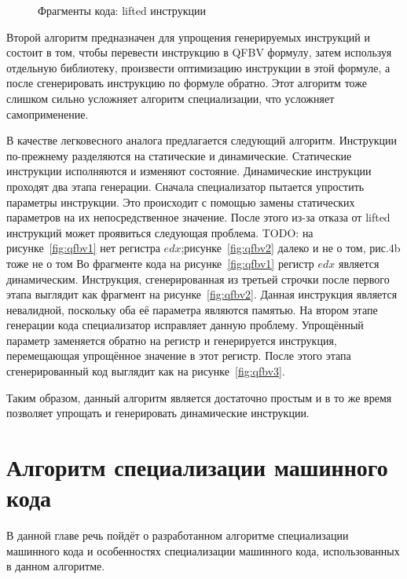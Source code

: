 \begin{figure}[!t]
\subfloat[\label{fig:qfbv1}]{\usebox\boxfour}
\hfill
\subfloat[\label{fig:qfbv2}]{\usebox\boxfive}
\hfill
\subfloat[\label{fig:qfbv3}]{\usebox\boxsix}
\caption{Фрагменты кода: lifted инструкции}
\end{figure}

Второй алгоритм предназначен для упрощения генерируемых инструкций и состоит в том, чтобы перевести инструкцию в QFBV формулу, затем используя отдельную библиотеку, произвести оптимизацию инструкции в этой формуле, а после сгенерировать инструкцию по формуле обратно. Этот алгоритм тоже слишком сильно усложняет алгоритм специализации, что усложняет самоприменение.

В качестве легковесного аналога предлагается следующий алгоритм. Инструкции по-прежнему разделяются на статические и динамические. Статические инструкции исполняются и изменяют состояние. Динамические инструкции проходят два этапа генерации. Сначала специализатор пытается упростить параметры инструкции. Это происходит с помощью замены статических параметров на их непосредственное значение. После этого из-за отказа от lifted инструкций может проявиться следующая проблема.
{\color{red}TODO: на рисунке~\ref{fig:qfbv1} нет регистра $edx$;рисунке~\ref{fig:qfbv2} далеко и не о том, рис.4b тоже не о том} 
Во фрагменте кода на рисунке~\ref{fig:qfbv1} регистр $edx$ является динамическим. Инструкция, сгенерированная из третьей строчки после первого этапа выглядит как фрагмент на рисунке~\ref{fig:qfbv2}.
Данная инструкция является невалидной, поскольку оба её параметра являются памятью. На втором этапе генерации кода специализатор исправляет данную проблему. Упрощённый параметр заменяется обратно на регистр и генерируется инструкция, перемещающая упрощённое значение в этот регистр. После этого этапа сгенерированный код выглядит как на рисунке~\ref{fig:qfbv3}.

Таким образом, данный алгоритм является достаточно простым и в то же время позволяет упрощать и генерировать динамические инструкции.

\section{ Алгоритм специализации машинного кода}
В данной главе речь пойдёт о разработанном алгоритме специализации машинного кода и особенностях специализации машинного кода, использованных в данном алгоритме.

